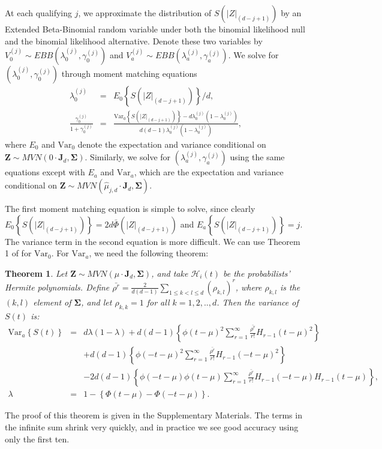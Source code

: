 \documentclass[12pt]{article}
\newtheorem{theorem}{Theorem}
\begin{document}
At each qualifying $j$, we  approximate the distribution of $S(|Z|_{(d-j+1)})$ 
by an Extended Beta-Binomial random variable under both the binomial 
likelihood null and the binomial likelihood alternative.
Denote these two variables by $V_{0}^{(j)}\sim EBB(\lambda_{0}^{(j)},\gamma_{0}^{(j)})$
and $V_{a}^{(j)}\sim EBB(\lambda_{a}^{(j)},\gamma_{a}^{(j)})$. 
We solve for $(\lambda_{0}^{(j)},\gamma_{0}^{(j)})$ through moment matching equations 
\begin{eqnarray*}
\lambda_{0}^{(j)} & = & E_{0}\left\{ S(|Z|_{(d-j+1)})\right\} /d, \\
\frac{\gamma_{0}^{(j)}}{1+\gamma_{0}^{(j)}} & = & \frac{\text{Var}_{0}\left\{ S(|Z|_{(d-j+1)})\right\} -d\lambda_{0}^{(j)}(1-\lambda_{0}^{(j)})}{d(d-1)\lambda_{0}^{(j)}(1-\lambda_{0}^{(j)})},
\end{eqnarray*}
where $E_{0}$ and $\text{Var}_{0}$ denote the expectation and variance
conditional on $\mathbf{Z}\sim MVN(0 \cdot \mathbf{J}_{d},\boldsymbol{\Sigma})$.
Similarly, we solve for $(\lambda_{a}^{(j)},\gamma_{a}^{(j)})$ using
the same equations except with $E_{a}$ and $\text{Var}_{a}$, which
are the expectation and variance conditional on $\mathbf{Z}\sim MVN(\widehat{\mu}_{j,d} \cdot \mathbf{J}_{d},\boldsymbol{\Sigma})$.

\sloppy
The first moment matching equation is simple to solve, since clearly
$E_{0}\left\{ S(|Z|_{(d-j+1)})\right\} = 2d\bar{\Phi}(|Z|_{(d-j+1)})$
and $E_{a}\left\{ S(|Z|_{(d-j+1)})\right\} = j$. 
The variance term in the second equation is more difficult. 
We can use Theorem 1 of \citet{GHC} for $\text{Var}_{0}$.
For $\text{Var}_{a}$, we need the following theorem:

\fussy
\begin{theorem} Let  $\mathbf{Z}\sim MVN( \mu \cdot \mathbf{J}_{d},\boldsymbol{\Sigma})$,
and take $\mathcal{H}_{i}(t)$ be the probabilists' Hermite polynomials.
Define $\bar{\rho^{r}}=\frac{2}{d(d-1)}\sum_{1\leq k<l\leq d}\left(\rho_{k,l}\right)^{r}$, where
$\rho_{k,l}$ is the $(k,l)$ element of $\boldsymbol{\Sigma}$, and let $\rho_{k,k}=1$ for all $k=1,2,..,d$. Then the variance of $S(t)$ is:
\begin{eqnarray*}
\text{Var}_{a}\left\{S(t)\right\} & = & d \lambda (1-\lambda) + d(d-1)\left\{ \phi(t-\mu)^{2}\sum_{r=1}^{\infty}\frac{\bar{\rho^{r}}}{r!}H_{r-1}(t-\mu)^{2}\right\} \\
 &  & +d(d-1)\left\{ \phi(-t-\mu)^{2}\sum_{r=1}^{\infty}\frac{\bar{\rho^{r}}}{r!}H_{r-1}(-t-\mu)^{2}\right\} \\
 &  & -2d(d-1)\left\{ \phi(-t-\mu)\phi(t-\mu)\sum_{r=1}^{\infty}\frac{\bar{\rho^{r}}}{r!}H_{r-1}(-t-\mu)H_{r-1}(t-\mu)\right\}, \\
 \lambda & = & 1 - \left \{ \Phi(t-\mu) - \Phi(-t-\mu) \right \}.
\end{eqnarray*}
\end{theorem}
The proof of this theorem is given in the Supplementary Materials. 
The terms in the infinite sum shrink very quickly, and in practice we see good accuracy
using only the first ten. 
\end{document}
